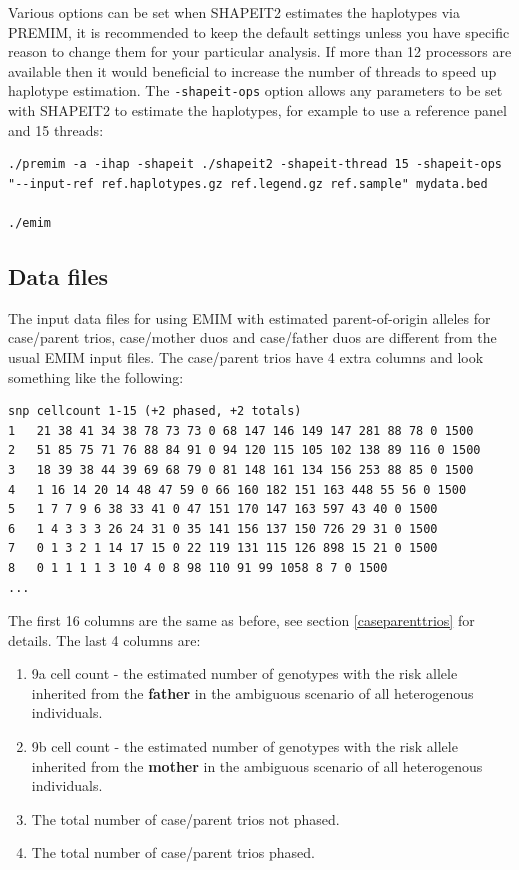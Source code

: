 \documentclass[a4paper,12pt]{article}
\newcommand{\code}[1]{{\footnotesize{{\tt #1}}}}
\begin{document}
Various options can be set when SHAPEIT2 estimates the haplotypes via PREMIM, it is recommended to keep the default settings unless you have specific reason to change them for your particular analysis. If more than 12 processors are available then it would beneficial to increase the number of threads to speed up haplotype estimation. The \code{-shapeit-ops} option allows any parameters to be set with SHAPEIT2 to estimate the haplotypes, for example to use a reference panel and 15 threads: 
\vspace{0.35cm} \begin{lstlisting}
./premim -a -ihap -shapeit ./shapeit2 -shapeit-thread 15 -shapeit-ops "--input-ref ref.haplotypes.gz ref.legend.gz ref.sample" mydata.bed

./emim

\end{lstlisting} \vspace{0.35cm}

\subsection{Data files}
\label{files}

The input data files for using EMIM with estimated parent-of-origin alleles for case/parent trios, case/mother duos and case/father duos are different from the usual EMIM input files. The case/parent trios have 4 extra columns and look something like the following: 
\vspace{0.35cm} \begin{lstlisting}
snp	cellcount 1-15 (+2 phased, +2 totals)
1	21 38 41 34 38 78 73 73 0 68 147 146 149 147 281 88 78 0 1500
2	51 85 75 71 76 88 84 91 0 94 120 115 105 102 138 89 116 0 1500
3	18 39 38 44 39 69 68 79 0 81 148 161 134 156 253 88 85 0 1500
4	1 16 14 20 14 48 47 59 0 66 160 182 151 163 448 55 56 0 1500
5	1 7 7 9 6 38 33 41 0 47 151 170 147 163 597 43 40 0 1500
6	1 4 3 3 3 26 24 31 0 35 141 156 137 150 726 29 31 0 1500
7	0 1 3 2 1 14 17 15 0 22 119 131 115 126 898 15 21 0 1500
8	0 1 1 1 1 3 10 4 0 8 98 110 91 99 1058 8 7 0 1500
...

\end{lstlisting} \vspace{0.35cm}
The first 16 columns are the same as before, see  section \ref{caseparenttrios} for details. The last 4 columns are: 
\begin{enumerate}

\item 9a cell count - the estimated number of genotypes with the risk allele inherited from the {\bf father} in the ambiguous scenario of all heterogenous individuals. 
\item 9b cell count - the estimated number of genotypes with the risk allele inherited from the {\bf mother} in the ambiguous scenario of all heterogenous individuals. 
\item The total number of case/parent trios not phased. 
\item The total number of case/parent trios phased.\end{enumerate}
\end{document}
